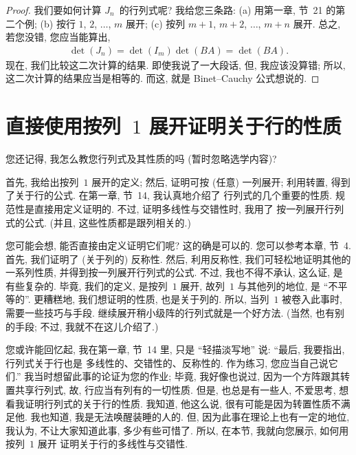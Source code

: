 \documentclass[%
    UTF8,%
    fontset=none,%
    punct=kaiming,%
    zihao=-4,%
    a4paper,%
    oneside,%
]{ctexbook}
\begin{document}
\begin{proof}
    我们要如何计算 \(J_n\)~的行列式呢?
    我给您三条路:
    (a) 用第一章, 节~21 的第二个例;
    (b) 按行 \(1\), \(2\), \(\dots\), \(m\) 展开;
    (c) 按列 \(m+1\), \(m+2\), \(\dots\), \(m+n\) 展开.
    总之, 若您没错, 您应当能算出,
    \begin{align*}
        \det {(J_n)} = \det {(I_m)} \det {(BA)}
        = \det {(BA)}.
    \end{align*}
    现在, 我们比较这二次计算的结果.
    即使我说了一大段话, 但, 我应该没算错;
    所以, 这二次计算的结果应当是相等的.
    而这, 就是 Binet--Cauchy 公式想说的.
\end{proof}

\section{\texorpdfstring{直接使用按列~\(1\) 展开证明关于行的性质}%
  {直接使用按列 1 展开证明关于行的性质}}

您还记得, 我怎么教您行列式及其性质的吗
(暂时忽略选学内容)?

首先, 我给出按列~\(1\) 展开的定义;
然后, 证明可按 (任意) 一列展开;
利用转置, 得到了关于行的公式.
在第一章, 节~14, 我认真地介绍了%
行列式的几个重要的性质.
规范性是直接用定义证明的.
不过, 证明多线性与交错性时, 我用了%
按一列展开行列式的公式.
(并且, 这些性质都是跟列相关的.)

您可能会想, 能否直接由定义证明它们呢?
这的确是可以的.
您可以参考本章, 节~4.
首先, 我们证明了 (关于列的) 反称性.
然后,
利用反称性, 我们可轻松地证明其他的一系列性质,
并得到按一列展开行列式的公式.
不过, 我也不得不承认,
这么证, 是有些复杂的.
毕竟, 我们的定义, 是按列~\(1\) 展开,
故列~\(1\) 与其他列的地位, 是 ``不平等的''.
更糟糕地, 我们想证明的性质, 也是关于列的.
所以, 当列~\(1\) 被卷入此事时,
需要一些技巧与手段.
继续展开稍小级阵的行列式就是一个好方法.
(当然, 也有别的手段;
不过, 我就不在这儿介绍了.)

您或许能回忆起, 我在第一章, 节~14 里,
只是 ``轻描淡写地'' 说:
``最后, 我要指出, 行列式关于行也是%
多线性的、交错性的、反称性的.
作为练习, 您应当自己说它们.''
我当时想留此事的论证为您的作业;
毕竟, 我好像也说过,
因为一个方阵跟其转置共享行列式,
故, 行应当有列有的一切性质.
但是, 也总是有一些人, 不爱思考,
想看我证明行列式的关于行的性质.
我知道, 他这么说,
很有可能是因为转置性质不满足他.
我也知道, 我是无法唤醒装睡的人的.
但, 因为此事在理论上也有一定的地位,
我认为, 不让大家知道此事, 多少有些可惜了.
所以, 在本节, 我就向您展示,
如何用按列~\(1\) 展开%
证明关于行的多线性与交错性.
\end{document}
